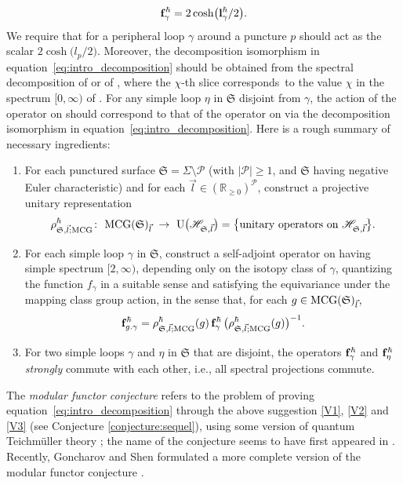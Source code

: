 \documentclass[10pt,a4paper]{amsart}
\numberwithin{equation}{section}
\theoremstyle{definition}
\begin{document}
\[
{\bf f}^\hbar_\gamma = 2\cosh\bigl({\bf l}^\hbar_\gamma/2\bigr).
\]
We require that  for a peripheral loop $\gamma$ around a puncture $p$ should act as the scalar $2\cosh\bigl(l_p/2\bigr)$. Moreover, the decomposition isomorphism in equation~\eqref{eq:intro_decomposition} should be obtained from the spectral decomposition of  or of , where the $\chi$-th slice  corresponds~to the value $\chi$ in the spectrum $[0,\infty)$ of . For any simple loop $\eta$ in $\mathfrak{S}$ disjoint from $\gamma$, the action of the operator  on  should correspond to that of the operator  on  via the decomposition isomorphism in equation~\eqref{eq:intro_decomposition}. Here is a rough summary of necessary ingredients:
\begin{enumerate}[label={\rm (V\arabic*)}]\itemsep=0pt
\item\label{V1} For each punctured surface $\mathfrak{S} = \Sigma\setminus\mathcal{P}$ (with $|\mathcal{P}|\ge 1$, and $\mathfrak{S}$ having negative Euler characteristic) and for each $\vec{l} \in (\mathbb{R}_{\ge 0})^\mathcal{P}$, construct a projective unitary representation
\[
\rho^\hbar_{\mathfrak{S},\vec{l};{\rm MCG}}\colon \ {\rm MCG}(\mathfrak{S})_{\vec{l}} ~\to~ {\rm U}\bigl(\mathscr{H}_{\mathfrak{S},\vec{l}}\bigr) = \bigl\{\mbox{unitary operators on $\mathscr{H}_{\mathfrak{S},\vec{l}}$}\bigr\}.
\]
\item\label{V2} For each simple loop $\gamma$ in $\mathfrak{S}$, construct a self-adjoint operator  on  having simple spectrum $[2,\infty)$, depending only on the isotopy class of $\gamma$, quantizing the function $f_\gamma$ in a suitable sense and satisfying the equivariance under the mapping class group action, in the sense that, for each $g \in {\rm MCG}(\mathfrak{S})_{\vec{l}}$,
\[
{\bf f}^\hbar_{g.\gamma} = \rho^\hbar_{\mathfrak{S},\vec{l};{\rm MCG}}(g) \, {\bf f}^\hbar_{\gamma} \, \bigl(\rho^\hbar_{\mathfrak{S},\vec{l};{\rm MCG}}(g)\bigr)^{-1}.
\]
\item\label{V3} For two simple loops $\gamma$ and $\eta$ in $\mathfrak{S}$ that are disjoint, the operators ${\bf f}^\hbar_\gamma$ and ${\bf f}^\hbar_\eta$ {\em strongly} commute with each other, i.e., all spectral projections commute.
\end{enumerate}
The {\em modular functor conjecture} refers to the problem of proving equation~\eqref{eq:intro_decomposition} through the above suggestion \ref{V1}, \ref{V2} and \ref{V3} (see Conjecture \ref{conjecture:sequel}), using some version of quantum Teichm\"uller theory \cite{F97, FG09, Ian, T, Verlinde}; the name of the conjecture seems to have first appeared in \cite{F97}. Recently, Goncharov and Shen formulated a more complete version of the modular functor conjecture \cite{GS19}.
\end{document}
